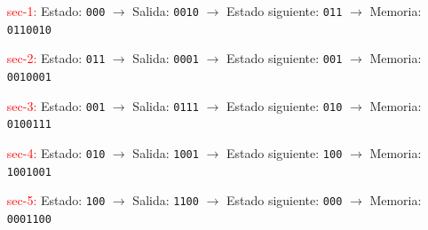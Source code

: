 \documentclass[12pt, letterpaper]{article}
\begin{document}
\begin{enumerate}
    \item[\textcolor{red}{sec-1:}] Estado: \texttt{000} \(\rightarrow\) Salida: \texttt{0010} \(\rightarrow\) Estado siguiente: \texttt{011} \(\rightarrow\) Memoria: \texttt{0110010}
    \item[\textcolor{red}{sec-2:}] Estado: \texttt{011} \(\rightarrow\) Salida: \texttt{0001} \(\rightarrow\) Estado siguiente: \texttt{001} \(\rightarrow\) Memoria: \texttt{0010001}
    \item[\textcolor{red}{sec-3:}] Estado: \texttt{001} \(\rightarrow\) Salida: \texttt{0111} \(\rightarrow\) Estado siguiente: \texttt{010} \(\rightarrow\) Memoria: \texttt{0100111}
    \item[\textcolor{red}{sec-4:}] Estado: \texttt{010} \(\rightarrow\) Salida: \texttt{1001} \(\rightarrow\) Estado siguiente: \texttt{100} \(\rightarrow\) Memoria: \texttt{1001001}
    \item[\textcolor{red}{sec-5:}] Estado: \texttt{100} \(\rightarrow\) Salida: \texttt{1100} \(\rightarrow\) Estado siguiente: \texttt{000} \(\rightarrow\) Memoria: \texttt{0001100}
\end{enumerate}
\end{document}
